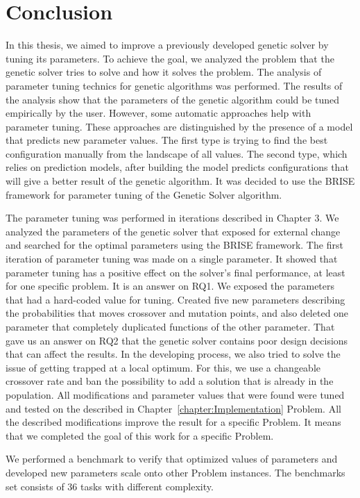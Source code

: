 \chapter{Conclusion}
\label{chapter:conclusion}
In this thesis, we aimed to improve a previously developed genetic solver by tuning its parameters. To achieve the goal, we analyzed the problem that the genetic solver tries to solve and how it solves the problem. The analysis of parameter tuning technics for genetic algorithms was performed. The results of the analysis show that the parameters of the genetic algorithm could be tuned empirically by the user. However, some automatic approaches help with parameter tuning. These approaches are distinguished by the presence of a model that predicts new parameter values. The first type is trying to find the best configuration manually from the landscape of all values. The second type, which relies on prediction models, after building the model predicts configurations that will give a better result of the genetic algorithm. It was decided to use the BRISE framework for parameter tuning of the Genetic Solver algorithm.

The parameter tuning was performed in iterations described in Chapter 3. We analyzed the parameters of the genetic solver that exposed for external change and searched for the optimal parameters using the BRISE framework.
The first iteration of parameter tuning was made on a single parameter. It showed that parameter tuning has a positive effect on the solver's final performance, at least for one specific problem. It is an answer on RQ1.
We exposed the parameters that had a hard-coded value for tuning. Created five new parameters describing the probabilities that moves crossover and mutation points, and also deleted one parameter that completely duplicated functions of the other parameter. That gave us an answer on RQ2 that the genetic solver contains poor design decisions that can affect the results.
In the developing process, we also tried to solve the issue of getting trapped at a local optimum.  For this, we use a changeable crossover rate and ban the possibility to add a solution that is already in the population.
All modifications and parameter values that were found were tuned and tested on the described in Chapter~\ref{chapter:Implementation} Problem.
All the described modifications improve the result for a specific Problem. It means that we completed the goal of this work for a specific Problem.

We performed a benchmark to verify that optimized values of parameters and developed new parameters scale onto other Problem instances. The benchmarks set consists of 36 tasks with different complexity. 

